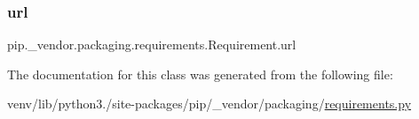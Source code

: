 \subsubsection{\texorpdfstring{url}{url}}
{\footnotesize\ttfamily pip.\+\_\+vendor.\+packaging.\+requirements.\+Requirement.\+url}



The documentation for this class was generated from the following file\+:\begin{DoxyCompactItemize}
\item 
venv/lib/python3./site-\/packages/pip/\+\_\+vendor/packaging/\hyperlink{pip_2__vendor_2packaging_2requirements_8py}{requirements.\+py}\end{DoxyCompactItemize}
